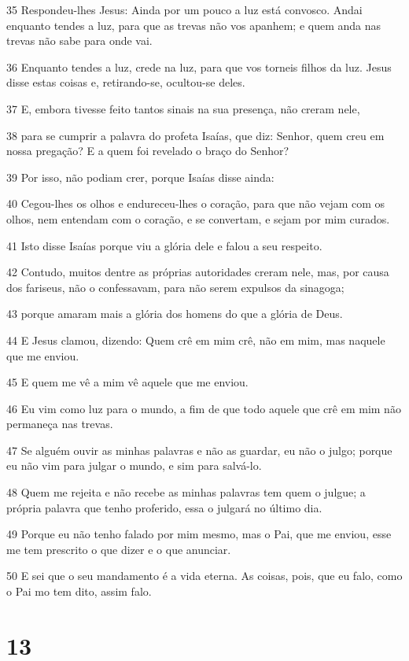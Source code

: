 \par 35 Respondeu-lhes Jesus: Ainda por um pouco a luz está convosco. Andai enquanto tendes a luz, para que as trevas não vos apanhem; e quem anda nas trevas não sabe para onde vai.
\par 36 Enquanto tendes a luz, crede na luz, para que vos torneis filhos da luz. Jesus disse estas coisas e, retirando-se, ocultou-se deles.
\par 37 E, embora tivesse feito tantos sinais na sua presença, não creram nele,
\par 38 para se cumprir a palavra do profeta Isaías, que diz: Senhor, quem creu em nossa pregação? E a quem foi revelado o braço do Senhor?
\par 39 Por isso, não podiam crer, porque Isaías disse ainda:
\par 40 Cegou-lhes os olhos e endureceu-lhes o coração, para que não vejam com os olhos, nem entendam com o coração, e se convertam, e sejam por mim curados.
\par 41 Isto disse Isaías porque viu a glória dele e falou a seu respeito.
\par 42 Contudo, muitos dentre as próprias autoridades creram nele, mas, por causa dos fariseus, não o confessavam, para não serem expulsos da sinagoga;
\par 43 porque amaram mais a glória dos homens do que a glória de Deus.
\par 44 E Jesus clamou, dizendo: Quem crê em mim crê, não em mim, mas naquele que me enviou.
\par 45 E quem me vê a mim vê aquele que me enviou.
\par 46 Eu vim como luz para o mundo, a fim de que todo aquele que crê em mim não permaneça nas trevas.
\par 47 Se alguém ouvir as minhas palavras e não as guardar, eu não o julgo; porque eu não vim para julgar o mundo, e sim para salvá-lo.
\par 48 Quem me rejeita e não recebe as minhas palavras tem quem o julgue; a própria palavra que tenho proferido, essa o julgará no último dia.
\par 49 Porque eu não tenho falado por mim mesmo, mas o Pai, que me enviou, esse me tem prescrito o que dizer e o que anunciar.
\par 50 E sei que o seu mandamento é a vida eterna. As coisas, pois, que eu falo, como o Pai mo tem dito, assim falo.

\chapter{13}

